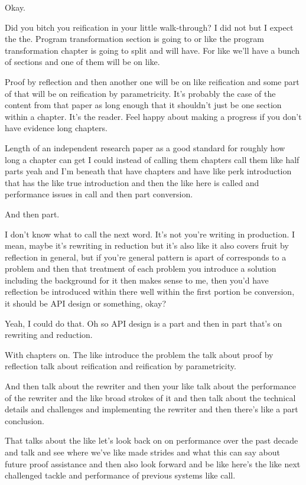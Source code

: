 \begin{subappendices}
Okay.

Did you bitch you reification in your little walk-through? I did not but I expect the the. Program transformation section is going to or like the program transformation chapter is going to split and will have. For like we'll have a bunch of sections and one of them will be on like.

Proof by reflection and then another one will be on like reification and some part of that will be on reification by parametricity. It's probably the case of the content from that paper as long enough that it shouldn't just be one section within a chapter. It's the reader. Feel happy about making a progress if you don't have evidence long chapters.

Length of an independent research paper as a good standard for roughly how long a chapter can get I could instead of calling them chapters call them like half parts yeah and I'm beneath that have chapters and have like perk introduction that has the like true introduction and then the like here is called and performance issues in call and then part conversion.

And then part.

I don't know what to call the next word. It's not you're writing in production. I mean, maybe it's rewriting in reduction but it's also like it also covers fruit by reflection in general, but if you're general pattern is apart of corresponds to a problem and then that treatment of each problem you introduce a solution including the background for it then makes sense to me, then you'd have reflection be introduced within there well within the first portion be conversion, it should be API design or something, okay?

Yeah, I could do that. Oh so API design is a part and then in part that's on rewriting and reduction.

With chapters on. The like introduce the problem the talk about proof by reflection talk about reification and reification by parametricity.

And then talk about the rewriter and then your like talk about the performance of the rewriter and the like broad strokes of it and then talk about the technical details and challenges and implementing the rewriter and then there's like a part conclusion.

That talks about the like let's look back on on performance over the past decade and talk and see where we've like made strides and what this can say about future proof assistance and then also look forward and be like here's the like next challenged tackle and performance of previous systems like call.


\end{subappendices}
